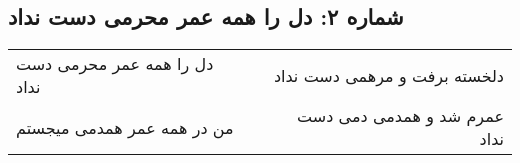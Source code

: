 \begin{center}
\section*{شماره ۲: دل را همه عمر محرمی دست نداد}
\label{sec:002}
\begin{longtable}{l p{0.5cm} r}
دل را همه عمر محرمی دست نداد
&&
دلخسته برفت و مرهمی دست نداد
\\
من در همه عمر همدمی میجستم
&&
عمرم شد و همدمی دمی دست نداد
\\
\end{longtable}
\end{center}
